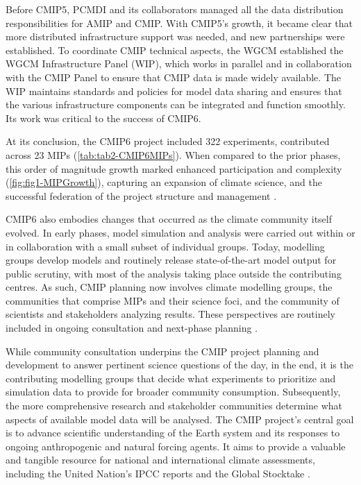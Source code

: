 \documentclass[gmd, preprint]{copernicus}
\begin{document}
Before CMIP5, PCMDI and its collaborators managed all the data distribution responsibilities for AMIP and CMIP. With CMIP5's growth, it became clear that more distributed infrastructure support was needed, and new partnerships were established. To coordinate CMIP technical aspects, the WGCM established the WGCM Infrastructure Panel (WIP), which works in parallel and in collaboration with the CMIP Panel to ensure that CMIP data is made widely available. The WIP maintains standards and policies for model data sharing and ensures that the various infrastructure components can be integrated and function smoothly. Its work was critical to the success of CMIP6. 

At its conclusion, the CMIP6 project included 322 experiments, contributed across 23 MIPs (\autoref{tab:tab2-CMIP6MIPs}). When compared to the prior phases, this order of magnitude growth marked enhanced participation and complexity (\autoref{fig:fig1-MIPGrowth}), capturing an expansion of climate science, and the successful federation of the project structure and management \citep{eyring_overview_2016}.

CMIP6 also embodies changes that occurred as the climate community itself evolved. In early phases, model simulation and analysis were carried out within or in collaboration with a small subset of individual groups. Today, modelling groups develop models and routinely release state-of-the-art model output for public scrutiny, with most of the analysis taking place outside the contributing centres. As such, CMIP planning now involves climate modelling groups, the communities that comprise MIPs and their science foci, and the community of scientists and stakeholders analyzing results. These perspectives are routinely included in ongoing consultation and next-phase planning \citep{stouffer_cmip5_2017}.

While community consultation underpins the CMIP project planning and development to answer pertinent science questions of the day, in the end, it is the contributing modelling groups that decide what experiments to prioritize and simulation data to provide for broader community consumption. Subsequently, the more comprehensive research and stakeholder communities determine what aspects of available model data will be analysed. The CMIP project's central goal is to advance scientific understanding of the Earth system and its responses to ongoing anthropogenic and natural forcing agents. It aims to provide a valuable and tangible resource for national and international climate assessments, including the United Nation's IPCC reports and the Global Stocktake \citep{stouffer_cmip5_2017}.
\end{document}

